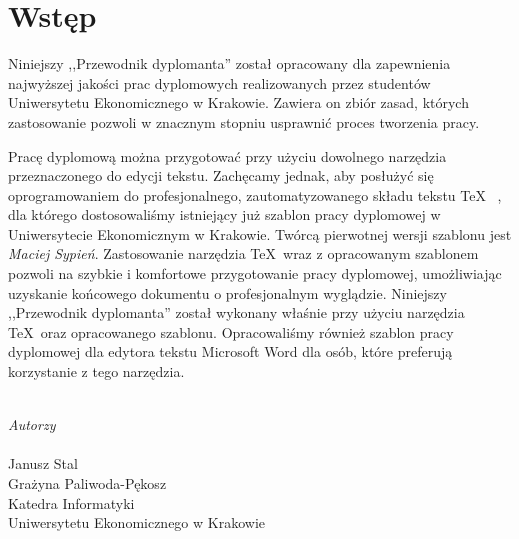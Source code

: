 \chapter*{Wstęp}
\label{chap:wstep}




Niniejszy ,,Przewodnik dyplomanta'' został opracowany dla zapewnienia najwyższej jakości prac dyplomowych realizowanych przez studentów Uniwersytetu Ekonomicznego w Krakowie. Zawiera on zbiór zasad, których zastosowanie pozwoli w znacznym stopniu usprawnić proces tworzenia pracy.

Pracę dyplomową można przygotować przy użyciu dowolnego narzędzia przeznaczonego do edycji tekstu. Zachęcamy jednak, aby posłużyć się oprogramowaniem do profesjonalnego, zautomatyzowanego składu tekstu \TeX~ \citep{website:latex}, dla którego dostosowaliśmy istniejący już szablon pracy dyplomowej w Uniwersytecie Ekonomicznym w Krakowie. Twórcą pierwotnej wersji szablonu jest \textit{Maciej Sypień}. Zastosowanie narzędzia \TeX~wraz z opracowanym szablonem pozwoli na szybkie i komfortowe przygotowanie pracy dyplomowej, umożliwiając uzyskanie końcowego dokumentu o profesjonalnym wyglądzie. Niniejszy ,,Przewodnik dyplomanta'' został wykonany właśnie przy użyciu narzędzia \TeX~oraz opracowanego szablonu. Opracowaliśmy również szablon pracy dyplomowej dla edytora tekstu Microsoft Word dla osób, które preferują korzystanie z tego narzędzia.



\begin{flushright}
~\\
\textit{Autorzy} \\
~\\
Janusz Stal \\
Grażyna Paliwoda-Pękosz\\
Katedra Informatyki\\
Uniwersytetu Ekonomicznego w Krakowie\\

\end{flushright}

